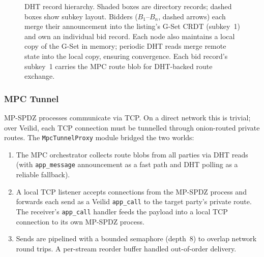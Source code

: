 \begin{figure}[htbp]
  \caption{DHT record hierarchy.  Shaded boxes are directory records;
    dashed boxes show subkey layout.  Bidders ($B_1$--$B_n$, dashed arrows)
    each merge their announcement into the listing's G-Set CRDT
    (subkey~1) and own an individual bid record.  Each node also
    maintains a local copy of the G-Set in memory; periodic DHT reads
    merge remote state into the local copy, ensuring convergence.
    Each bid record's subkey~1 carries the MPC route blob for
    DHT-backed route exchange.}
  \label{fig:dht-hierarchy}
\end{figure}

\newpage
\subsubsection{MPC Tunnel}
MP-SPDZ processes communicate via TCP.  On a direct network this is trivial;
over Veilid, each TCP connection must be tunnelled through onion-routed private
routes.  The \texttt{MpcTunnelProxy} module bridged the two worlds:

\begin{enumerate}
  \item The MPC orchestrator collects route blobs from all parties via DHT
    reads (with \texttt{app\_message} announcement as a fast path and DHT
    polling as a reliable fallback).
  \item A local TCP listener accepts connections from the MP-SPDZ process and
    forwards each send as a Veilid \texttt{app\_call} to the target party's
    private route.  The receiver's \texttt{app\_call} handler feeds the
    payload into a local TCP connection to its own MP-SPDZ process.
  \item Sends are pipelined with a bounded semaphore (depth~8) to overlap
    network round trips.  A per-stream reorder buffer handled out-of-order
    delivery.
\end{enumerate}

